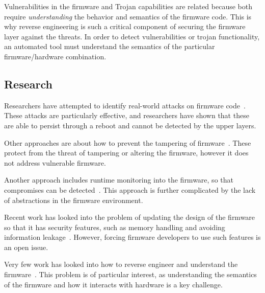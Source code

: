\documentclass[11pt,letterpaper]{article}
\begin{document}

Vulnerabilities in the firmware and Trojan capabilities are related
because both require \emph{understanding} the behavior and semantics
of the firmware code. This is why reverse engineering is such a
critical component of securing the firmware layer against the threats.
In order to detect vulnerabilities or trojan functionality, an
automated tool must understand the semantics of the particular
firmware/hardware combination. 

\subsection{Research}
Researchers have attempted to identify real-world attacks on firmware
code~\cite{tsow2006, cui2010, duflot2011, basnight2013, cui2013,
  zaddach2013, zaddach2013a, maskiewicz2014, stuttgen2015}. These
attacks are particularly effective, and researchers have shown that
these are able to persist through a reboot and cannot be detected by
the upper layers. 

Other approaches are about how to prevent the tampering of
firmware~\cite{adelstein2002, zhou2007, zhou2009}. These protect from
the threat of tampering or altering the firmware, however it does not
address vulnerable firmware. 

Another approach includes runtime monitoring into the
firmware, so that compromises can be detected~\cite{cui2010a,
  cui2011}. This approach is further complicated by the lack of
abstractions in the firmware environment. 

Recent work has looked into the problem of updating the design of the
firmware so that it has security features, such as memory handling and
avoiding information leakage~\cite{koeberl2014, kauer2007}. However,
forcing firmware developers to use such features is an open issue.

Very few work has looked into how to reverse engineer and understand the
firmware~\cite{zaddach2014}. This problem is of particular interest,
as understanding the semantics of the firmware and how it interacts
with hardware is a key challenge. 
\end{document}
